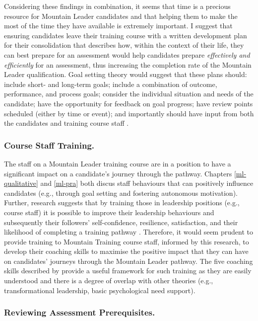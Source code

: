 \documentclass[
  12pt,
  a4paper,
]{book}
\begin{document}
Considering these findings in combination, it seems that time is a precious resource for Mountain Leader candidates and that helping them to make the most of the time they have available is extremely important. I suggest that ensuring candidates leave their training course with a written development plan for their consolidation that describes how, within the context of their life, they can best prepare for an assessment would help candidates prepare \emph{effectively and efficiently} for an assessment, thus increasing the completion rate of the Mountain Leader qualification. Goal setting theory would suggest that these plans should: include short- and long-term goals; include a combination of outcome, performance, and process goals; consider the individual situation and needs of the candidate; have the opportunity for feedback on goal progress; have review points scheduled (either by time or event); and importantly should have input from both the candidates and training course staff \citep[cf.~][]{Gould2005, Weinberg2014}.

\hypertarget{course-staff-training.}{%
\subsubsection{Course Staff Training.}\label{course-staff-training.}}

The staff on a Mountain Leader training course are in a position to have a significant impact on a candidate's journey through the pathway. Chapters \ref{ml-qualitative} and \ref{ml-pra} both discus staff behaviours that can positively influence candidates (e.g., through goal setting and fostering autonomous motivation). Further, research suggests that by training those in leadership positions (e.g., course staff) it is possible to improve their leadership behaviours and subsequently their followers' self-confidence, resilience, satisfaction, and their likelihood of completing a training pathway \citep[cf.~][]{Hardy2010}. Therefore, it would seem prudent to provide training to Mountain Training course staff, informed by this research, to develop their coaching skills to maximise the positive impact that they can have on candidates' journeys through the Mountain Leader pathway. The five coaching skills described by \citet{Wagstaff2018} provide a useful framework for such training as they are easily understood and there is a degree of overlap with other theories (e.g., transformational leadership, basic psychological need support).

\hypertarget{reviewing-assessment-prerequisites.}{%
\subsubsection{Reviewing Assessment Prerequisites.}\label{reviewing-assessment-prerequisites.}}
\end{document}
